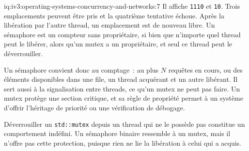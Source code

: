 \begin{solution}{iq:iv3:operating-systems-concurrency-and-networks:7}
Il affiche \texttt{1110} et \texttt{10}. Trois emplacements peuvent être pris et la quatrième tentative échoue. Après la libération par l'autre thread, un emplacement est de nouveau libre. Un sémaphore est un compteur sans propriétaire, si bien que n'importe quel thread peut le libérer, alors qu'un mutex a un propriétaire, et seul ce thread peut le déverrouiller.

Un sémaphore convient donc au comptage~: au plus $N$ requêtes en cours, ou des éléments disponibles dans une file, un thread acquérant et un autre libérant. Il sert aussi à la signalisation entre threads, ce qu'un mutex ne peut pas faire. Un mutex protège une section critique, et sa règle de propriété permet à un système d'offrir l'héritage de priorité ou une vérification de débogage.

Déverrouiller un \texttt{std::mutex} depuis un thread qui ne le possède pas constitue un comportement indéfini. Un sémaphore binaire ressemble à un mutex, mais il n'offre pas cette protection, puisque rien ne lie la libération à celui qui a acquis.

\end{solution}

